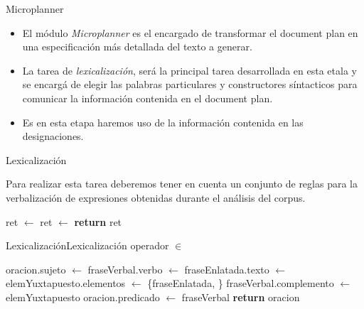 \documentclass{beamer}
\begin{document}
\begin{frame}{Microplanner}{}
  \begin{itemize}
    \item El módulo \textit{Microplanner} es el encargado de transformar el document plan en una especificación más detallada del texto a generar.


    \item La tarea de \textit{lexicalización}, será la principal tarea desarrollada en esta etala y se encargá de elegir las palabras particulares y constructores síntacticos para comunicar la información contenida en el document plan.

    \item Es en esta etapa haremos uso de la información contenida en las designaciones.
  \end{itemize}
\end{frame}
                                
\begin{frame}[fragile]{Lexicalización}{}

  Para realizar esta tarea deberemos tener en cuenta un conjunto de reglas para la verbalización de expresiones obtenidas durante el análisis del corpus.
  
  \begin{algorithm}[H]
    \caption{Bosquejo algoritmo lexicalización \textsc{lexicalizacion}}
    \scriptsize
    \begin{algorithmic}[1]
    \State ret $\gets$ 
    \Else
    \State ret $\gets$ 
    \EndIf
    \State \textbf{return} ret
    \EndFunction
    \end{algorithmic}
  \end{algorithm}
\end{frame}

\begin{frame}[fragile]{Lexicalización}{Lexicalización operador $\in$}
  
  \begin{algorithm}[H]
    \caption{Caso para \textsc{lexicalizacion} del operador $\protect\in$}
    \scriptsize
    \begin{algorithmic}[1]
    \State oracion.sujeto $\gets$ 
    \State fraseVerbal.verbo $\gets$ 
    \State fraseEnlatada.texto $\gets$ 
    \State elemYuxtapuesto.elementos $\gets$ \{fraseEnlatada, \}
    \State fraseVerbal.complemento $\gets$ elemYuxtapuesto
    \State oracion.predicado $\gets$ fraseVerbal
    \State \textbf{return} oracion
    \EndFunction
    \end{algorithmic}
  \end{algorithm}

\end{frame}
\end{document}
